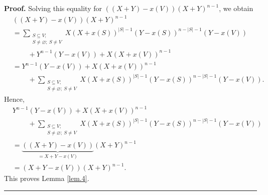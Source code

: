 \documentclass[numbers=enddot,12pt,final,onecolumn,notitlepage]{scrartcl}%
\theoremstyle{definition}
\newenvironment{proof}[1][Proof]{\noindent\textbf{#1.} }{\ \rule{0.5em}{0.5em}}
\let\sumnonlimits\sum
\renewcommand{\sum}{\sumnonlimits\limits}
\newenvironment{verlong}{}{}
\begin{document}
\begin{verlong}
\begin{proof}
Solving this equality for $\left(  \left(  X+Y\right)  -x\left(  V\right)
\right)  \left(  X+Y\right)  ^{n-1}$, we obtain%
\begin{align*}
&  \left(  \left(  X+Y\right)  -x\left(  V\right)  \right)  \left(
X+Y\right)  ^{n-1}\\
&  =\sum_{\substack{S\subseteq V;\\S\neq\varnothing;\ S\neq V}}X\left(
X+x\left(  S\right)  \right)  ^{\left\vert S\right\vert -1}\left(  Y-x\left(
S\right)  \right)  ^{n-\left\vert S\right\vert -1}\left(  Y-x\left(  V\right)
\right) \\
&  \ \ \ \ \ \ \ \ \ \ +Y^{n-1}\left(  Y-x\left(  V\right)  \right)  +X\left(
X+x\left(  V\right)  \right)  ^{n-1}\\
&  =Y^{n-1}\left(  Y-x\left(  V\right)  \right)  +X\left(  X+x\left(
V\right)  \right)  ^{n-1}\\
&  \ \ \ \ \ \ \ \ \ \ +\sum_{\substack{S\subseteq V;\\S\neq\varnothing
;\ S\neq V}}X\left(  X+x\left(  S\right)  \right)  ^{\left\vert S\right\vert
-1}\left(  Y-x\left(  S\right)  \right)  ^{n-\left\vert S\right\vert
-1}\left(  Y-x\left(  V\right)  \right)  .
\end{align*}
Hence,%
\begin{align*}
&  Y^{n-1}\left(  Y-x\left(  V\right)  \right)  +X\left(  X+x\left(  V\right)
\right)  ^{n-1}\\
&  \ \ \ \ \ \ \ \ \ \ +\sum_{\substack{S\subseteq V;\\S\neq\varnothing
;\ S\neq V}}X\left(  X+x\left(  S\right)  \right)  ^{\left\vert S\right\vert
-1}\left(  Y-x\left(  S\right)  \right)  ^{n-\left\vert S\right\vert
-1}\left(  Y-x\left(  V\right)  \right) \\
&  =\underbrace{\left(  \left(  X+Y\right)  -x\left(  V\right)  \right)
}_{=X+Y-x\left(  V\right)  }\left(  X+Y\right)  ^{n-1}\\
&  =\left(  X+Y-x\left(  V\right)  \right)  \left(  X+Y\right)  ^{n-1}.
\end{align*}
This proves Lemma \ref{lem.4}.
\end{proof}


\end{verlong}
\end{document}
